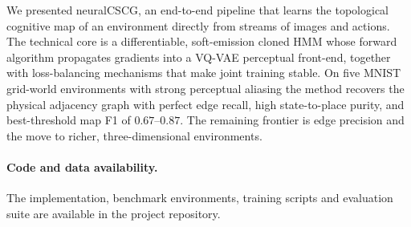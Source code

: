 \documentclass[twocolumn,10pt]{article}
\begin{document}
We presented neuralCSCG, an end-to-end pipeline that learns the topological
cognitive map of an environment directly from streams of images and actions.
The technical core is a differentiable, soft-emission cloned HMM whose forward
algorithm propagates gradients into a VQ-VAE perceptual front-end, together
with loss-balancing mechanisms that make joint training stable. On five MNIST
grid-world environments with strong perceptual aliasing the method recovers
the physical adjacency graph with perfect edge recall, high state-to-place
purity, and best-threshold map F1 of $0.67$--$0.87$. The remaining frontier is
edge precision and the move to richer, three-dimensional environments.

\paragraph{Code and data availability.}
The implementation, benchmark environments, training scripts and evaluation
suite are available in the project repository.
\end{document}
